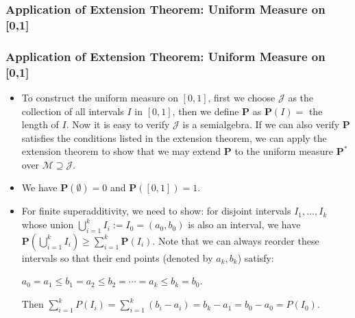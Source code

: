 \documentclass[handout]{beamer}
\newcommand{\BP}{\mathbf{P}}
\begin{document}
\subsubsection{Application of Extension Theorem: Uniform Measure on [0,1]}
\frame
{
  \frametitle{Application of Extension Theorem: Uniform Measure on [0,1]}

   \begin{itemize}

            \item<1->To construct the uniform measure on $[0,1]$, first we choose $\mathcal{J}$ as the collection of all intervals $I$ in $[0,1]$, then we define $\mathbf{P}$ as $\mathbf{P}(I)=$ the length of  $I$. Now it is easy to verify $\mathcal{J}$ is a semialgebra. If we can also verify  $\mathbf{P}$  satisfies the conditions listed in the extension theorem, we can apply the extension theorem to show that we may extend  $\mathbf{P}$ to the uniform measure $\BP^*$ over $\mathcal{M}\supseteq \mathcal{J}$.
            
\item<2-> We have $\mathbf{P} (\emptyset)=0$ and $\mathbf{P} ([0,1])=1$.

\item<3-> For finite superadditivity, we need to show: for disjoint intervals $I_1,\ldots,I_k$ whose union $\bigcup_{i=1}^k I_i := I_0 = (a_0, b_0)$ is also an interval, we have $\BP(\bigcup_{i=1}^k I_i)\geq \sum_{i=1}^k \BP(I_i)$.  Note that we can always reorder these intervals so that their end points (denoted by $a_k, b_k$) satisfy:

$a_0=a_1\leq b_1=a_2 \leq b_2=\cdots =a_k\leq b_k=b_0$.

Then $\sum_{i=1}^k P(I_i)=\sum_{i=1}^k (b_i-a_i)=b_k-a_1=b_0-a_0=P(I_0)$.


       
                   \end{itemize}
}
\end{document}
